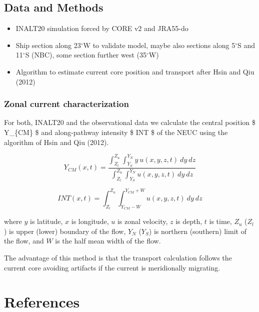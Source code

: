 \documentclass[a4paperpaper,]{article}
\providecommand{\tightlist}{%
  \setlength{\itemsep}{0pt}\setlength{\parskip}{0pt}}
\begin{document}
\subsection{Data and Methods}\label{data-and-methods}

\begin{itemize}
\tightlist
\item
  INALT20 simulation forced by CORE v2 and JRA55-do
\item
  Ship section along 23\(^{\circ}\)W to validate model, maybe also
  sections along 5\(^{\circ}\)S and 11\(^{\circ}\)S (NBC), some section
  further west (35\(^{\circ}\)W)
\item
  Algorithm to estimate current core position and transport after Hsin
  and Qiu (2012)
\end{itemize}

\subsubsection{Zonal current
characterization}\label{zonal-current-characterization}

For both, INALT20 and the observational data we calculate the central
position \$ Y\_\{CM\} \$ and along-pathway intensity \$ INT \$ of the
NEUC using the algorithm of Hsin and Qiu (2012).

\begin{equation}
Y_{CM}(x,t) = \frac{\int_{Z_l}^{Z_u} \int_{Y_{S}}^{Y_{N}} y\ u(x,y,z,t)\ dy\ dz}{\int_{Z_l}^{Z_u} \int_{Y_{S}}^{Y_{N}} u(x,y,z,t)\ dy\ dz}
\label{equ_Y_CM}
\end{equation}

\begin{equation}
INT(x,t) = \int_{Z_l}^{Z_u} \int_{Y_{CM}-W}^{Y_{CM}+W} u(x,y,z,t)\ dy\ dz 
\label{equ_INT}
\end{equation}

where \(y\) is latitude, \(x\) is longitude, \(u\) is zonal velocity,
\(z\) is depth, \(t\) is time, \(Z_u\) (\(Z_l\)) is upper (lower)
boundary of the flow, \(Y_N\) (\(Y_S\)) is northern (southern) limit of
the flow, and \(W\) is the half mean width of the flow.

The advantage of this method is that the transport calculation follows
the current core avoiding artifacts if the current is meridionally
migrating.

\section*{References}\label{references}
\end{document}
